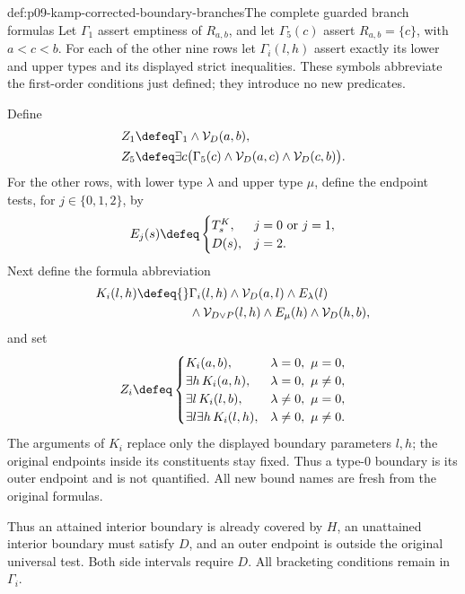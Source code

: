 \begin{hbdefinition}{def:p09-kamp-corrected-boundary-branches}{The complete guarded branch formulas}
Let \(\Gamma_1\) assert emptiness of \(R_{a,b}\), and let
\(\Gamma_5(c)\) assert \(R_{a,b}=\{c\}\), with \(a<c<b\).
For each of the other nine rows let
\(\Gamma_i(l,h)\) assert exactly its lower and upper types and
its displayed strict inequalities. These symbols abbreviate the
first-order conditions just defined; they introduce no new predicates.

Define
\[
\begin{aligned}
 Z_1&\defeq\Gamma_1\land\mathcal V_D(a,b),\\
 Z_5&\defeq\exists c\bigl(\Gamma_5(c)\land
                     \mathcal V_D(a,c)\land\mathcal V_D(c,b)\bigr).
\end{aligned}
\]
For the other rows, with lower type \(\lambda\) and upper type
\(\mu\), define the endpoint tests, for \(j\in\{0,1,2\}\), by
\[
 E_j(s)\defeq
 \begin{cases}
 T^K_s,&j=0\text{ or }j=1,\\
 D(s),&j=2.
\end{cases}
\]
Next define the formula abbreviation
\[
\begin{split}
 K_i(l,h)\defeq{}&\Gamma_i(l,h)\land\mathcal V_D(a,l)
       \land E_\lambda(l)\\
 &{}\land\mathcal V_{D\lor P}(l,h)
       \land E_\mu(h)\land\mathcal V_D(h,b),
\end{split}
\]
and set
\[
 Z_i\defeq
 \begin{cases}
 K_i(a,b),&\lambda=0,\ \mu=0,\\
 \exists h\,K_i(a,h),&\lambda=0,\ \mu\ne0,\\
 \exists l\,K_i(l,b),&\lambda\ne0,\ \mu=0,\\
 \exists l\exists h\,K_i(l,h),&\lambda\ne0,\ \mu\ne0.
 \end{cases}
\]
The arguments of \(K_i\) replace only the displayed boundary
parameters \(l,h\); the original endpoints inside its constituents
stay fixed. Thus a type-0 boundary is its outer endpoint and is not
quantified. All new bound names are fresh from the original formulas.

Thus an attained interior boundary is already covered by \(H\),
an unattained interior boundary must satisfy \(D\), and an outer
endpoint is outside the original universal test. Both side intervals
require \(D\). All bracketing conditions remain in \(\Gamma_i\).
\end{hbdefinition}

